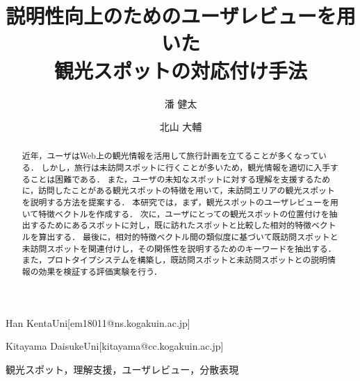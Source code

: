\documentclass[submit]{ipsj}
\begin{document}
\title{説明性向上のためのユーザレビューを用いた\\観光スポットの対応付け手法}




\author{潘 健太}{Han Kenta}{Uni}[em18011@ns.kogakuin.ac.jp]
\author{北山 大輔}{Kitayama Daisuke}{Uni}[kitayama@cc.kogakuin.ac.jp]

\begin{abstract}
近年，ユーザはWeb上の観光情報を活用して旅行計画を立てることが多くなっている．
しかし，旅行は未訪問スポットに行くことが多いため，観光情報を適切に入手することは困難である．
また，ユーザの未知なスポットに対する理解を支援するために，訪問したことがある観光スポットの特徴を用いて，未訪問エリアの観光スポットを説明する方法を提案する．
本研究では，まず，観光スポットのユーザレビューを用いて特徴ベクトルを作成する．
次に，ユーザにとっての観光スポットの位置付けを抽出するためにあるスポットに対し，既に訪れたスポットと比較した相対的特徴ベクトルを算出する．
最後に，相対的特徴ベクトル間の類似度に基づいて既訪問スポットと未訪問スポットを関連付けし，その関係性を説明するためのキーワードを抽出する．
また，プロトタイプシステムを構築し，既訪問スポットと未訪問スポットとの説明情報の効果を検証する評価実験を行う．
\end{abstract}


\begin{jkeyword}
観光スポット，理解支援，ユーザレビュー，分散表現
\end{jkeyword}
\end{document}
